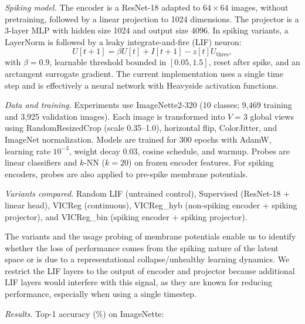 \documentclass[12pt]{article}
\begin{document}
\begin{NoHyper}
    \emph{Spiking model.}
    The encoder is a ResNet-18 adapted to \(64\times64\) images, without pretraining, followed by a linear projection to 1024 dimensions.
    The projector is a 3-layer MLP with hidden size 1024 and output size 4096. In spiking variants, a LayerNorm is followed by a leaky
    integrate-and-fire (LIF) neuron:
    \[
        U[t+1]=\beta U[t]+I[t+1]-z[t]U_{\text{thres}},
    \]
    with \(\beta=0.9\), learnable threshold bounded in \([0.05,1.5]\), reset after spike,
    and an arctangent surrogate gradient.
    The current implementation uses a single time step and is effectively a neural network with Heavyside activation functions. \vspace{3pt}

    \emph{Data and training.}
    Experiments use ImageNette2-320 (10 classes; 9,469 training and 3,925 validation images). Each image is transformed into \(V=3\) global views using RandomResizedCrop (scale 0.35--1.0), horizontal flip, ColorJitter, and ImageNet normalization. Models are trained for 300 epochs with AdamW, learning rate \(10^{-3}\), weight decay 0.03, cosine schedule, and warmup. Probes are linear classifiers and \(k\)-NN (\(k=20\)) on frozen encoder features. For spiking encoders, probes are also applied to pre-spike membrane potentials.
    \vspace{3pt}

    \emph{Variants compared.}
    Random LIF (untrained control), Supervised (ResNet-18 + linear head), VICReg (continuous), VICReg\_hyb (non-spiking encoder + spiking projector),
    and VICReg\_bin (spiking encoder + spiking projector).

    The variants and the usage probing of membrane potentials enable us to identify whether the loss
    of performance comes from the spiking nature of the latent space or is due to a representational collapse/unhealthy learning dynamics. We restrict the
    LIF layers to the output of encoder and projector because additional LIF layers
    would interfere with this signal, as they are known for reducing performance, especially when using a single timestep.
    \vspace{3pt}

    \emph{Results.}
    Top-1 accuracy (\%) on ImageNette:


\end{NoHyper}
\end{document}
